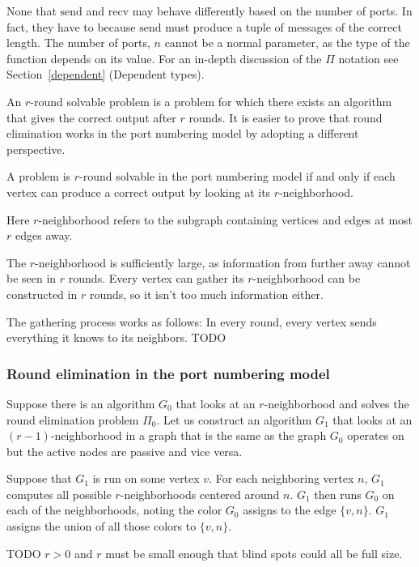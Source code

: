 \documentclass[english, 12pt, a4paper, sci, a-1b, online]{aaltothesis}
\begin{document}
None that $\text{send}$ and $\text{recv}$ may behave differently based on the number of ports. In fact, they have to because $\text{send}$ must produce a tuple of messages of the correct length. The number of ports, $n$ cannot be a normal parameter, as the type of the function depends on its value. For an in-depth discussion of the $\Pi$ notation see Section~\ref{dependent} (Dependent types).

An $r$-round solvable problem is a problem for which there exists an algorithm that gives the correct output after $r$ rounds. It is easier to prove that round elimination works in the port numbering model by adopting a different perspective.

\begin{lemma}
  A problem is $r$-round solvable in the port numbering model if and only if each vertex can produce a correct output by looking at its $r$-neighborhood.
\end{lemma}
Here $r$-neighborhood refers to the subgraph containing vertices and edges at most $r$ edges away.

The $r$-neighborhood is sufficiently large, as information from further away cannot be seen in $r$ rounds. Every vertex can gather its $r$-neighborhood can be constructed in $r$ rounds, so it isn't too much information either.

The gathering process works as follows: In every round, every vertex sends everything it knows to its neighbors. TODO

\subsubsection{Round elimination in the port numbering model}

Suppose there is an algorithm $G_0$ that looks at an $r$-neighborhood and solves the round elimination problem $\Pi_0$. Let us construct an algorithm $G_1$ that looks at an $(r-1)$-neighborhood in a graph that is the same as the graph $G_0$ operates on but the active nodes are passive and vice versa.

Suppose that $G_1$ is run on some vertex $v$. For each neighboring vertex $n$, $G_1$ computes all possible $r$-neighborhoods centered around $n$. $G_1$ then runs $G_0$ on each of the neighborhoods, noting the color $G_0$ assigns to the edge $\{v, n\}$. $G_1$ assigns the union of all those colors to $\{v, n\}$.

TODO $r > 0$ and $r$ must be small enough that blind spots could all be full size.
\end{document}
